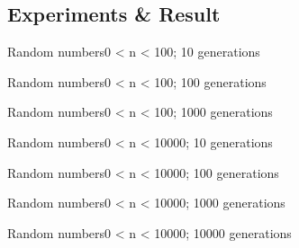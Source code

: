 \documentclass{beamer}
\begin{document}
\subsection{Experiments \& Result}

\begin{frame}{Random numbers}{0 < n < 100; 10 generations}
  \begin{centering}
  \end{centering}
\end{frame}

\begin{frame}{Random numbers}{0 < n < 100; 100 generations}
  \begin{centering}
  \end{centering}
\end{frame}

\begin{frame}{Random numbers}{0 < n < 100; 1000 generations}
  \begin{centering}
  \end{centering}
\end{frame}

\begin{frame}{Random numbers}{0 < n < 10000; 10 generations}
  \begin{centering}
  \end{centering}
\end{frame}

\begin{frame}{Random numbers}{0 < n < 10000; 100 generations}
  \begin{centering}
  \end{centering}
\end{frame}

\begin{frame}{Random numbers}{0 < n < 10000; 1000 generations}
  \begin{centering}
  \end{centering}
\end{frame}

\begin{frame}{Random numbers}{0 < n < 10000; 10000 generations}
  \begin{centering}
  \end{centering}
\end{frame}
\end{document}

